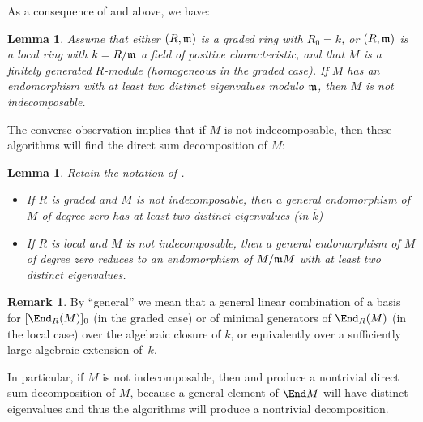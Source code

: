 \documentclass[12pt]{article}
\let\bar\overline
\theoremstyle{theorem}
\numberwithin{thm}{section}
\newtheorem{lem}[thm]{Lemma}
\theoremstyle{definition}
\newtheorem{rem}[thm]{Remark}
\begin{document}
As a consequence of  and  above, we have:

\begin{lem}\label{lem:term}
  Assume that either $(R,\mathfrak m)$ is a graded ring with $R_0=k$, or $(R,\mathfrak m)$ is a local ring with $k=R/\mathfrak m$ a field of positive characteristic, and that $M$ is a finitely generated $R$-module (homogeneous in the graded case).
  If $M$ has an endomorphism with at least two distinct eigenvalues modulo $\mathfrak m$, then $M$ is not indecomposable.
\end{lem}

The converse observation implies that if $M$ is not indecomposable, then these algorithms will find the direct sum decomposition of $M$:

\begin{lem}\label{lem:distinct}
  Retain the notation of .
  \begin{itemize}
  \item If $R$ is graded and $M$ is not indecomposable, then a general endomorphism of $M$ of degree zero has at least two distinct eigenvalues (in $\bar k$)
  \item If $R$ is local and $M$ is not indecomposable, then a general endomorphism of $M$ of degree zero reduces to an endomorphism of $M/\mathfrak m M$ with at least two distinct eigenvalues.
  \end{itemize}
\end{lem}

\begin{rem}
  By ``general'' we mean that a general linear combination of a basis for $[\End_R(M)]_0$ (in the graded case) or of minimal generators of $\End_R(M)$ (in the local case) over the algebraic closure of $k$, or equivalently over a sufficiently large algebraic extension of~$k$.
\end{rem}



In particular, if $M$ is not indecomposable, then  and  produce a nontrivial direct sum decomposition of $M$, because a general element of $\End M$ will have distinct eigenvalues and thus the algorithms will produce a nontrivial decomposition.
\end{document}
